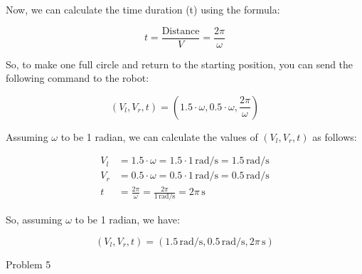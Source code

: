 \documentclass[answers]{exam}
\begin{document}
\begin{questions}
\begin{parts}
\begin{solution}
            Now, we can calculate the time duration (t) using the formula:

            \[t = \frac{\text{Distance}}{V} = \frac{2\pi}{\omega}\]

            So, to make one full circle and return to the starting position, you can send
            the following command to the robot:

            \[(V_l, V_r, t) = (1.5\cdot\omega, 0.5\cdot\omega, \frac{2\pi}{\omega})\]

            Assuming \(\omega\) to be 1 radian, we can calculate the values of \((V_l, V_r,
            t)\) as follows:

            \begin{align*}
                V_l & = 1.5 \cdot \omega = 1.5 \cdot 1 \, \text{rad/s} = 1.5 \, \text{rad/s}    \\
                V_r & = 0.5 \cdot \omega = 0.5 \cdot 1 \, \text{rad/s} = 0.5 \, \text{rad/s}    \\
                t   & = \frac{2\pi}{\omega} = \frac{2\pi}{1 \, \text{rad/s}} = 2\pi \, \text{s}
            \end{align*}

            So, assuming \(\omega\) to be 1 radian, we have:

            \[
                (V_l, V_r, t) = (1.5 \, \text{rad/s}, 0.5 \, \text{rad/s}, 2\pi \, \text{s})
            \]
        \end{solution}
    \end{parts}
    \question Problem 5

\end{questions}
\end{document}
